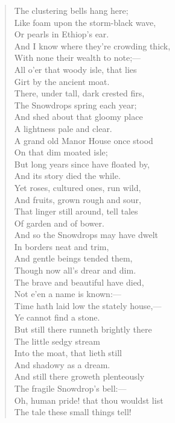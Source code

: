 \documentclass[11pt,twoside]{article}
\begin{document}
\begin{verse}
\quad The clustering bells hang here;\\
Like foam upon the storm-black wave,\\
\quad Or pearls in Ethiop’s ear.\\
And I know where they’re crowding thick,\\
\quad With none their wealth to note;---\\
All o’er that woody isle, that lies\\
\quad Girt by the ancient moat.\\
There, under tall, dark crested firs,\\
\quad The Snowdrops spring each year;\\
And shed about that gloomy place\\
\quad A lightness pale and clear.\\
A grand old Manor House once stood\\
\quad On that dim moated isle;\\
But long years since have floated by,\\
\quad And its story died the while.\\
Yet roses, cultured ones, run wild,\\
\quad And fruits, grown rough and sour,\\
That linger still around, tell tales\\
\quad Of garden and of bower.\\
And so the Snowdrops may have dwelt\\
\quad In borders neat and trim,\\
And gentle beings tended them,\\
\quad Though now all’s drear and dim.\\
The brave and beautiful have died,\\
\quad Not e’en a name is known:---\\
Time hath laid low the stately house,---\\
\quad Ye cannot find a stone.\\
But still there runneth brightly there\\
\quad The little sedgy stream\\
Into the moat, that lieth still\\
\quad And shadowy as a dream.\\
And still there groweth plenteously\\
\quad The fragile Snowdrop’s bell:---\\
Oh, human pride! that thou wouldst list\\
\quad The tale these small things tell!
\end{verse}
\end{document}
